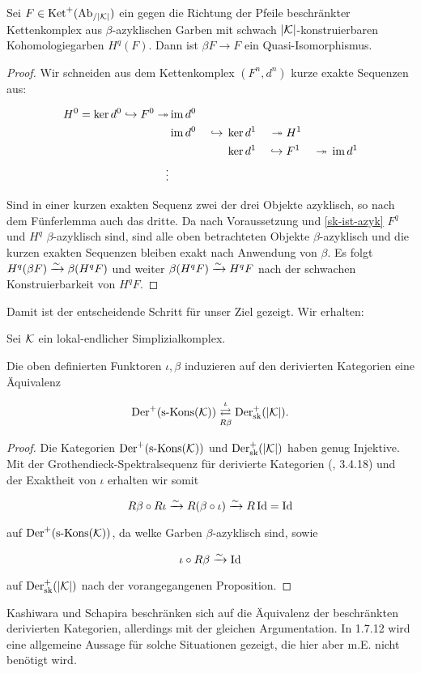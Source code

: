 \begin{prop}
  Sei $F \in \operatorname{Ket}^+(\operatorname{Ab}_{/|\mathcal{K}|})$ ein gegen die Richtung der Pfeile
  beschränkter Kettenkomplex aus $\beta$-azy\-klischen Garben mit
  schwach $|\mathcal{K}|$-kon\-stru\-ier\-bar\-en Kohomologiegarben $H^q(F)$. Dann
  ist $\beta F \to F$ ein Quasi-Iso\-mor\-phis\-mus.
\end{prop}
\begin{proof}
  Wir schneiden aus dem Kettenkomplex $(F^n, d^n)$ kurze exakte
  Sequenzen aus:
  
  \begin{alignat*}{4}
    H^0 = \ker d^0 \hookrightarrow F^0 \twoheadrightarrow &\operatorname{im} d^0 & & \\
    &\operatorname{im} d^0& {} \hookrightarrow {} &\ker d^1& {}\twoheadrightarrow {} &H^1& \\
    && &\ker d^1& {} \hookrightarrow {} &F^1& {} \twoheadrightarrow {} \operatorname{im} d^1 \\
    \vdots
  \end{alignat*}
  
  Sind in einer kurzen exakten Sequenz zwei der drei Objekte
  azyklisch, so nach dem Fünferlemma auch das dritte. Da nach
  Voraussetzung und \ref{sk-ist-azyk} $F^q$ und $H^q$
  $\beta$-azyklisch sind, sind alle oben betrachteten Objekte
  $\beta$-azyklisch und die kurzen exakten Sequenzen bleiben exakt
  nach Anwendung von $\beta$. Es folgt $H^q(\beta F) \xrightarrow{\sim} \beta (H^q
  F)$ und weiter $\beta (H^q F) \xrightarrow{\sim} H^q F$ nach der schwachen
  Konstruierbarkeit von $H^q F$.
\end{proof}

Damit ist der entscheidende Schritt für unser Ziel gezeigt. Wir
erhalten:

\begin{theorem}
  Sei $\mathcal{K}$ ein lokal-endlicher Simplizialkomplex. %

  Die oben definierten Funktoren $\iota, \beta$ induzieren auf den
  derivierten Kategorien eine Äquivalenz

  \[ \operatorname{Der}^+(\operatorname{s-Kons}(\mathcal{K})) \mathrel{\mathop{\rightleftarrows}^{\iota}_{R \beta}} \operatorname{Der}^+_{\mathrm{sk}}(|\mathcal{K}|). \]
\end{theorem}
\begin{proof}
  Die Kategorien $\operatorname{Der}^+(\operatorname{s-Kons}(\mathcal{K}))$ und $\operatorname{Der}^+_{\mathrm{sk}}(|\mathcal{K}|)$ haben genug
  Injektive.  Mit der Grothendieck-Spektralsequenz für derivierte
  Kategorien (\cite{TD}, 3.4.18) und der Exaktheit von $\iota$
  erhalten wir somit

  \[ R\beta \circ R\iota \xrightarrow{\sim} R(\beta \circ \iota) \xrightarrow{\sim} R \operatorname{Id} = \operatorname{Id} \]

  auf $\operatorname{Der}^+(\operatorname{s-Kons}(\mathcal{K}))$, da welke Garben $\beta$-azyklisch sind, sowie

  \[ \iota \circ R \beta \xrightarrow{\sim} \operatorname{Id} \]

  auf $\operatorname{Der}^+_{\mathrm{sk}}(|\mathcal{K}|)$ nach der vorangegangenen Proposition.
\end{proof}
\begin{bem}
  Kashiwara und Schapira beschränken sich auf die Äquivalenz der
  beschränkten derivierten Kategorien, allerdings mit der gleichen
  Argumentation. In \cite{KS} 1.7.12 wird eine allgemeine Aussage für
  solche Situationen gezeigt, die hier aber m.E. nicht benötigt wird.
\end{bem}


